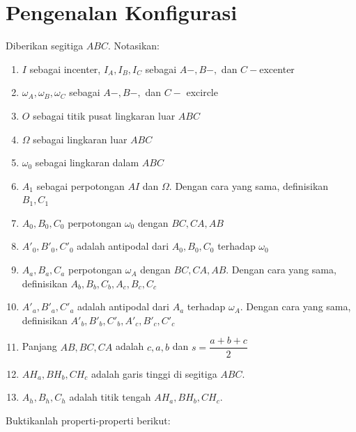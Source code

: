 \documentclass[11pt]{scrartcl}
\begin{document}
\section{Pengenalan Konfigurasi}
Diberikan segitiga $ABC$. Notasikan:
\begin{enumerate}
    \item $I$ sebagai incenter, $I_A, I_B, I_C$ sebagai $A-, B-, $ dan $C-$excenter
    \item $\omega_A, \omega_B, \omega_C$ sebagai $A-, B-, $ dan $C-$ excircle
    \item $O$ sebagai titik pusat lingkaran luar $ABC$
    \item $\Omega$ sebagai lingkaran luar $ABC$
    \item $\omega_0$ sebagai lingkaran dalam $ABC$
    \item $A_1$ sebagai perpotongan $AI$ dan $\Omega$. Dengan cara yang sama, definisikan $B_1, C_1$
    \item $A_0, B_0, C_0$ perpotongan $\omega_0$ dengan $BC, CA, AB$
    \item $A'_0, B'_0 , C'_0$ adalah antipodal dari $A_0, B_0, C_0$ terhadap $\omega_0$
    \item $A_a, B_a, C_a$ perpotongan $\omega_A$ dengan $BC, CA, AB$. Dengan cara yang sama, definisikan $A_b, B_b, C_b, A_c, B_c, C_c$
    \item $A'_a, B'_a, C'_a$ adalah antipodal dari $A_a$ terhadap $\omega_A$. Dengan cara yang sama, definisikan $A'_b, B'_b, C'_b, A'_c, B'_c, C'_c$
    \item Panjang $AB, BC, CA$ adalah $c, a, b$ dan $s = \dfrac{a + b + c}{2}$
    \item $AH_a, BH_b, CH_c$ adalah garis tinggi di segitiga $ABC$.
    \item $A_h, B_h, C_h$ adalah titik tengah $AH_a, BH_b, CH_c$.
\end{enumerate}
Buktikanlah properti-properti berikut:
\end{document}
